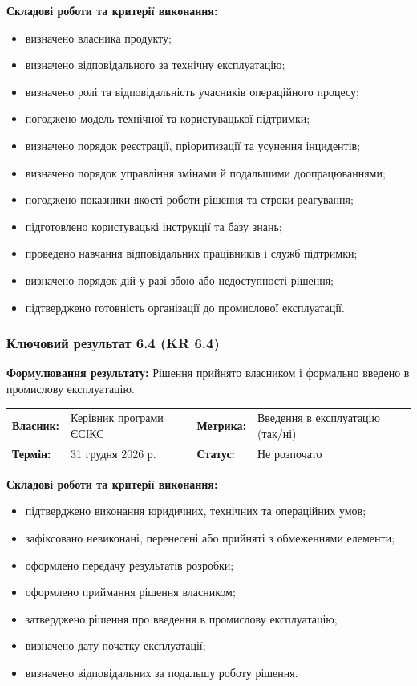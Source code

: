 \documentclass{article}
\begin{document}
\vspace{10pt}
\textbf{Складові роботи та критерії виконання:}
\begin{itemize}
    \item визначено власника продукту;
    \item визначено відповідального за технічну експлуатацію;
    \item визначено ролі та відповідальність учасників операційного процесу;
    \item погоджено модель технічної та користувацької підтримки;
    \item визначено порядок реєстрації, пріоритизації та усунення інцидентів;
    \item визначено порядок управління змінами й подальшими доопрацюваннями;
    \item погоджено показники якості роботи рішення та строки реагування;
    \item підготовлено користувацькі інструкції та базу знань;
    \item проведено навчання відповідальних працівників і служб підтримки;
    \item визначено порядок дій у разі збою або недоступності рішення;
    \item підтверджено готовність організації до промислової експлуатації.
\end{itemize}

\subsubsection{Ключовий результат 6.4 (KR 6.4)}

\textbf{Формулювання результату:} Рішення прийнято власником і формально введено в промислову експлуатацію.

\noindent\begin{tabular}{@{}p{2.2cm}p{4.5cm}p{2.2cm}p{4.5cm}@{}}
\toprule
\textbf{Власник:} & Керівник програми ЄСІКС & \textbf{Метрика:} & Введення в експлуатацію (так/ні) \\
\textbf{Термін:} & 31 грудня 2026 р. & \textbf{Статус:} & Не розпочато \\
\bottomrule
\end{tabular}

\vspace{10pt}
\textbf{Складові роботи та критерії виконання:}
\begin{itemize}
    \item підтверджено виконання юридичних, технічних та операційних умов;
    \item зафіксовано невиконані, перенесені або прийняті з обмеженнями елементи;
    \item оформлено передачу результатів розробки;
    \item оформлено приймання рішення власником;
    \item затверджено рішення про введення в промислову експлуатацію;
    \item визначено дату початку експлуатації;
    \item визначено відповідальних за подальшу роботу рішення.
\end{itemize}
\end{document}
